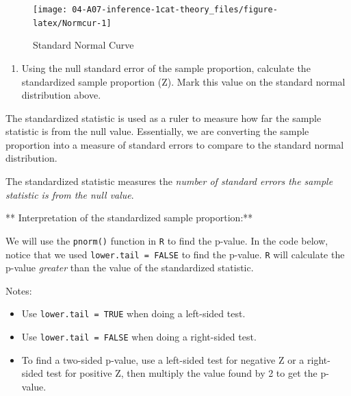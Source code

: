 \documentclass[
]{report}
\providecommand{\tightlist}{%
  \setlength{\itemsep}{0pt}\setlength{\parskip}{0pt}}
\begin{document}
\vspace{2mm}

\begin{figure}

{\centering \texttt{[image: 04-A07-inference-1cat-theory\_files/figure-latex/Normcur-1]} 

}

\caption{Standard Normal Curve}\label{fig:Normcur}
\end{figure}

\begin{enumerate}
\def\labelenumi{\arabic{enumi}.}
\setcounter{enumi}{5}
\tightlist
\item
  Using the null standard error of the sample proportion, calculate the standardized sample proportion (Z). Mark this value on the standard normal distribution above.
\end{enumerate}

\vspace{0.6in}

The standardized statistic is used as a ruler to measure how far the sample statistic is from the null value. Essentially, we are converting the sample proportion into a measure of standard errors to compare to the standard normal distribution.

The standardized statistic measures the \emph{number of standard errors the sample statistic is from the null value}.

** Interpretation of the standardized sample proportion:**

\vspace{.8in}

We will use the \texttt{pnorm()} function in \texttt{R} to find the p-value. In the code below, notice that we used \texttt{lower.tail\ =\ FALSE} to find the p-value. \texttt{R} will calculate the p-value \emph{greater} than the value of the standardized statistic.

Notes:

\begin{itemize}
\tightlist
\item
  Use \texttt{lower.tail\ =\ TRUE} when doing a left-sided test.
\item
  Use \texttt{lower.tail\ =\ FALSE} when doing a right-sided test.
\item
  To find a two-sided p-value, use a left-sided test for negative Z or a right-sided test for positive Z, then multiply the value found by 2 to get the p-value.
\end{itemize}
\end{document}
